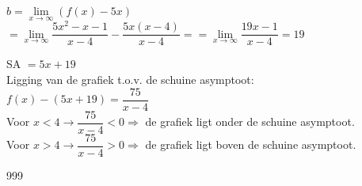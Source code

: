 \documentclass[a4paper]{article}
\begin{document}
$b = \lim\limits_{x \rightarrow \infty} (f(x) - 5x)$\\

$ = \lim\limits_{x \rightarrow \infty}\dfrac{5x^2 -x -1}{x - 4} - \dfrac{5x(x-4)}{x-4} = = \lim\limits_{x \rightarrow \infty}\dfrac{19x - 1}{x - 4} = 19$

SA $= 5x + 19$\\

Ligging van de grafiek t.o.v. de schuine asymptoot:\\

$f(x) - (5x+19) = \dfrac{75}{x-4}$\\

Voor $x < 4 \rightarrow \dfrac{75}{x-4} < 0 \Rightarrow$ de grafiek ligt onder de schuine asymptoot.\\

Voor $x > 4 \rightarrow \dfrac{75}{x-4} > 0 \Rightarrow$ de grafiek ligt boven de schuine asymptoot.\\

















\begin{thebibliography}{999}
\end{thebibliography}
\end{document}
